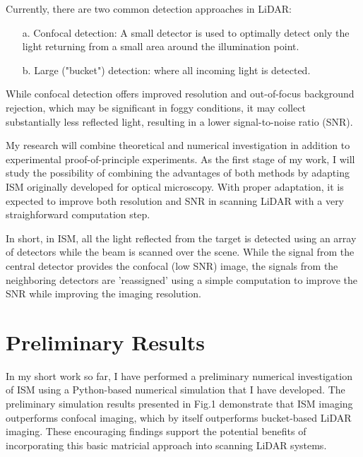 \documentclass{article}
\begin{document}

Currently, there are two common detection approaches in LiDAR:
\begin{enumerate}
    \item[a.] Confocal detection: A small detector is used to optimally detect only the light returning from a small area around the illumination point.
\item[b.] Large ("bucket") detection: where all incoming light is detected.
\end{enumerate}

While confocal detection offers improved resolution and out-of-focus background rejection, which may be significant in foggy conditions, it may collect substantially less reflected light, resulting in a lower signal-to-noise ratio (SNR).

My research will combine theoretical and numerical investigation in addition to experimental proof-of-principle experiments. As the first stage of my work, I will study the possibility of combining the advantages of both methods by adapting ISM originally developed for optical microscopy. With proper adaptation, it is expected to improve both resolution and SNR in scanning LiDAR with a very straighforward computation step.

In short, in ISM, all the light reflected from the target is detected using an array of detectors while the beam is scanned over the scene. While the signal from the central detector provides the confocal (low SNR) image, the signals from the neighboring detectors are 'reassigned' using a simple computation to improve the SNR while improving the imaging resolution.

\section{Preliminary Results}
In my short work so far, I have performed a preliminary numerical investigation of ISM using a Python-based numerical simulation that I have developed. 
The preliminary simulation results presented in Fig.1  demonstrate that ISM imaging outperforms confocal imaging, which by itself outperforms bucket-based LiDAR imaging. These encouraging findings support the potential benefits of incorporating this basic matricial approach into scanning LiDAR systems.
\end{document}
